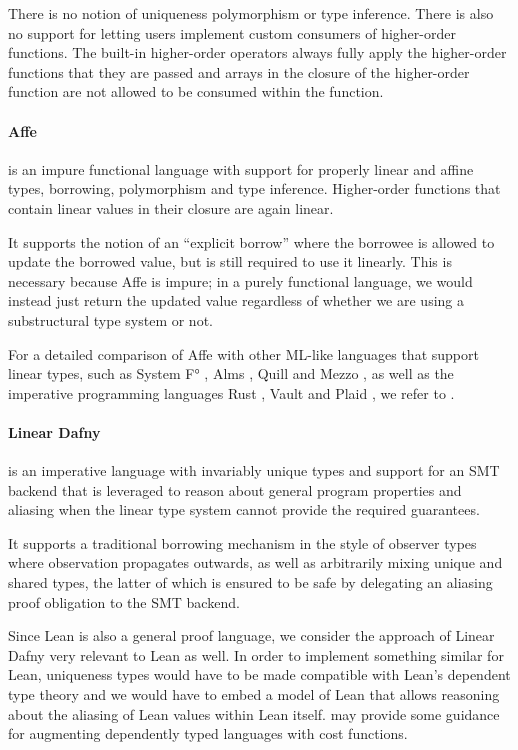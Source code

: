 There is no notion of uniqueness polymorphism or type inference. There is also no support for letting users implement custom consumers of higher-order functions. The built-in higher-order operators always fully apply the higher-order functions that they are passed and arrays in the closure of the higher-order function are not allowed to be consumed within the function.

\paragraph{Affe \citep{radanne_kindly_2020}} is an impure functional language with support for properly linear and affine types, borrowing, polymorphism and type inference. Higher-order functions that contain linear values in their closure are again linear.

It supports the notion of an ``explicit borrow'' where the borrowee is allowed to update the borrowed value, but is still required to use it linearly. This is necessary because Affe is impure; in a purely functional language, we would instead just return the updated value regardless of whether we are using a substructural type system or not.

For a detailed comparison of Affe with other ML-like languages that support linear types, such as System F° \citep{mazurak_lightweight_2010}, Alms \citep{tov_practical_2011}, Quill \citep{morris_best_2016} and Mezzo \citep{balabonski_design_2016}, as well as the imperative programming languages Rust \citep{weiss_oxide_2021}, Vault \citep{deline_enforcing_2001} and Plaid \citep{garcia_foundations_2014}, we refer to \citep{radanne_kindly_2020}.

\paragraph{Linear Dafny \citep{li_linear_2022}} is an imperative language with invariably unique types and support for an SMT backend \citep{barrett_satisfiability_2018} that is leveraged to reason about general program properties and aliasing when the linear type system cannot provide the required guarantees. 

It supports a traditional borrowing mechanism in the style of observer types \citep{goos_observers_1992} where observation propagates outwards, as well as arbitrarily mixing unique and shared types, the latter of which is ensured to be safe by delegating an aliasing proof obligation to the SMT backend.

Since Lean is also a general proof language, we consider the approach of Linear Dafny very relevant to Lean as well. In order to implement something similar for Lean, uniqueness types would have to be made compatible with Lean's dependent type theory and we would have to embed a model of Lean that allows reasoning about the aliasing of Lean values within Lean itself. \cite{niu_cost-aware_2021} may provide some guidance for augmenting dependently typed languages with cost functions.